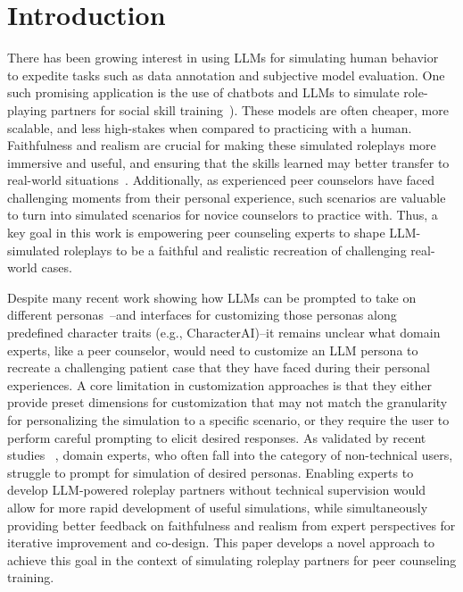 \section{Introduction}
There has been growing interest in using LLMs for simulating human behavior ~\cite{park2023generative, park2022social, zhou2023sotopia} to expedite tasks such as data annotation and subjective model evaluation. One such promising application is the use of chatbots and LLMs to simulate role-playing partners for social skill training~\cite{othlinghaus2020seriousroleplaying, markel_opferman_landay_piech_2023, chen2023llmempowered}). These models are often cheaper, more scalable, and less high-stakes  when compared to practicing with a human. Faithfulness and realism are crucial for making these simulated roleplays more immersive and useful, and ensuring that the skills learned may better transfer to real-world situations~\cite{alinier2022simulation}.  Additionally, as experienced peer counselors have faced challenging moments from their personal experience, such scenarios are valuable to turn into simulated scenarios for novice counselors to practice with. Thus, a key goal in this work is empowering peer counseling experts to shape LLM-simulated roleplays to be a faithful and realistic recreation of challenging real-world cases. 


Despite many recent work showing how LLMs can be prompted to take on different personas~\cite{park2023generative}--and interfaces for customizing those personas along predefined character traits (e.g., CharacterAI)--it remains unclear what domain experts, like a peer counselor, would need to customize an LLM persona to recreate a challenging patient case that they have faced during their personal experiences. A core limitation in customization approaches is that they either provide preset dimensions for customization that may not match the granularity for personalizing the simulation to a specific scenario, or they require the user to perform careful prompting to elicit desired responses. As validated by recent studies ~\cite{whyjohnnycantprompt}, domain experts, who often fall into the category of non-technical users, struggle to prompt for simulation of desired personas.  Enabling experts to develop LLM-powered roleplay partners without technical supervision would allow for more rapid development of useful simulations, while simultaneously providing better feedback on faithfulness and realism from expert perspectives for iterative improvement and co-design. This paper develops a novel approach to achieve this goal in the context of simulating roleplay partners for peer counseling training.  

